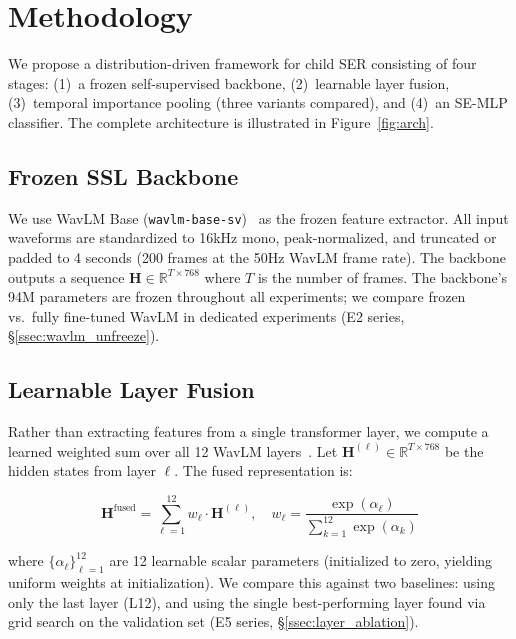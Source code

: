 
\section{Methodology}
\label{sec:methodology}

We propose a distribution-driven framework for child SER consisting of four
stages: (1)~a frozen self-supervised backbone, (2)~learnable layer fusion,
(3)~temporal importance pooling (three variants compared), and (4)~an SE-MLP
classifier. The complete architecture is illustrated in Figure~\ref{fig:arch}.

\subsection{Frozen SSL Backbone}
\label{ssec:backbone}

We use WavLM Base (\texttt{wavlm-base-sv})~\cite{chen2022wavlm} as the frozen
feature extractor. All input waveforms are standardized to 16kHz mono, peak-normalized,
and truncated or padded to 4 seconds (200 frames at the 50Hz WavLM frame rate).
The backbone outputs a sequence $\mathbf{H} \in \mathbb{R}^{T \times 768}$ where
$T$ is the number of frames. The backbone's 94M parameters are frozen throughout
all experiments; we compare frozen vs.\ fully fine-tuned WavLM in dedicated
experiments (E2 series, \S\ref{ssec:wavlm_unfreeze}).

\subsection{Learnable Layer Fusion}
\label{ssec:layer_fusion}

Rather than extracting features from a single transformer layer, we compute a
learned weighted sum over all 12 WavLM layers~\cite{rozen2024layer}. Let
$\mathbf{H}^{(\ell)} \in \mathbb{R}^{T \times 768}$ be the hidden states from
layer $\ell$. The fused representation is:

\begin{equation}
\mathbf{H}^{\text{fused}} = \sum_{\ell=1}^{12} w_\ell \cdot \mathbf{H}^{(\ell)},
\quad w_\ell = \frac{\exp(\alpha_\ell)}{\sum_{k=1}^{12} \exp(\alpha_k)}
\end{equation}

where $\{\alpha_\ell\}_{\ell=1}^{12}$ are 12 learnable scalar parameters
(initialized to zero, yielding uniform weights at initialization). We compare
this against two baselines: using only the last layer (L12), and using the
single best-performing layer found via grid search on the validation set
(E5 series, \S\ref{ssec:layer_ablation}).

